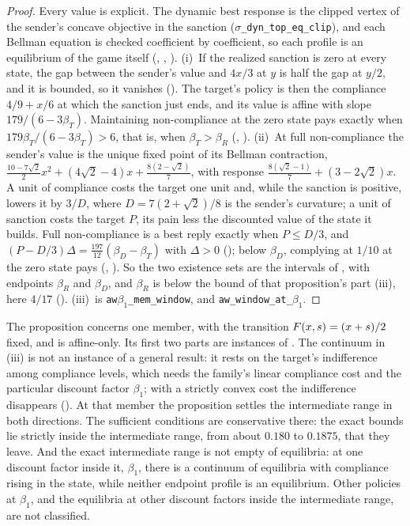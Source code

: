 \begin{proof}
Every value is explicit. The dynamic best response is the clipped vertex of the sender's
concave objective in the sanction (\texttt{$\sigma$\_dyn\_top\_eq\_clip}), and each
Bellman equation is checked coefficient by coefficient, so each profile is an
equilibrium of the game itself (,
, ). (i)~If the realized sanction is
zero at every state, the gap between the sender's value and $4x/3$ at $y$ is half the
gap at $y/2$, and it is bounded, so it vanishes (). The
target's policy is then the compliance $4/9+x/6$ at which the sanction just ends, and
its value is affine with slope $179/(6-3\beta_T)$. Maintaining non-compliance at the zero state pays
exactly when $179\beta_T/(6-3\beta_T)>6$, that is, when $\beta_T>\beta_R$
(, ). (ii)~At full non-compliance the sender's
value is the unique fixed point of its Bellman contraction,
$\tfrac{10-7\sqrt2}2x^2+(4\sqrt2-4)x+\tfrac{8(2-\sqrt2)}7$, with response
$\tfrac{8(\sqrt2-1)}7+(3-2\sqrt2)x$. A unit of compliance costs the target one unit
and, while the sanction is positive, lowers it by $3/D$, where $D=7(2+\sqrt2)/8$ is the
sender's curvature; a unit of sanction costs the target $P$, its pain less the
discounted value of the state it builds. Full non-compliance is a best reply exactly when
$P\le D/3$, and $(P-D/3)\Delta=\tfrac{197}{12}(\beta_D-\beta_T)$ with $\Delta>0$
(); below $\beta_D$, complying at $1/10$ at the zero state pays
(, ). So the two existence sets are
the intervals of , with endpoints $\beta_R$ and $\beta_D$, and
$\beta_R$ is below the bound of that proposition's part (iii), here $4/17$
(). (iii)~is \texttt{aw$\beta_1$\_mem\_window},
 and \texttt{aw\_window\_at\_$\beta_1$}.
\end{proof}

The proposition concerns one member, with the transition $F(x,s)=(x+s)/2$ fixed, and
is affine-only. Its first two parts are instances of . The
continuum in (iii) is not an instance of a general result: it rests on the target's
indifference among compliance levels, which needs the family's linear compliance cost and
the particular discount factor $\beta_1$; with a strictly convex cost the indifference
disappears (). At that member the proposition settles the
intermediate range in both directions. The
sufficient conditions are conservative there: the exact bounds lie strictly inside the intermediate range,
from about $0.180$ to $0.1875$, that they leave. And the exact intermediate range is not empty of
equilibria: at one discount factor inside it, $\beta_1$, there is a continuum of
equilibria with compliance rising in the state, while neither endpoint profile is an
equilibrium. Other policies at $\beta_1$, and the equilibria at other discount factors
inside the intermediate range, are not classified.


